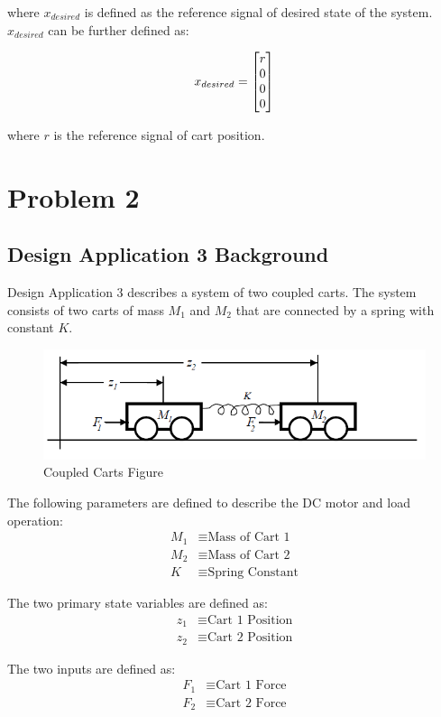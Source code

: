 \documentclass[]{article}
\begin{document}
			where $x_{desired}$ is defined as the reference signal of desired state of the system. $x_{desired}$ can be further defined as:
			
			\begin{equation}
				x_{desired} = \mqty[r\\0\\0\\0]
			\end{equation} 
			
			where $r$ is the reference signal of cart position.
						
\newpage
\section{Problem 2}
	\subsection{Design Application 3 Background}
		Design Application 3 describes a system of two coupled carts. The system consists of two carts of mass $M_1$ and $M_2$ that are connected by a spring with constant $K$.
		
		\begin{figure}[h]
			\centering
			\includegraphics[width=0.7\linewidth]{Fig/DesignApplication3}
			\caption{Coupled Carts Figure}
			\label{fig:designapplication3}
		\end{figure}
		
		The following parameters are defined to describe the DC motor and load operation:
		\begin{align*}
			M_1 &\equiv \text{Mass of Cart 1}\\
			M_2 &\equiv \text{Mass of Cart 2}\\
			K &\equiv \text{Spring Constant}
		\end{align*}
		
		The two primary state variables are defined as:
		\begin{align*}
			z_1 &\equiv \text{Cart 1 Position}\\
			z_2 &\equiv \text{Cart 2 Position}
		\end{align*}
		
		The two inputs are defined as:
		\begin{align*}
			F_1 &\equiv \text{Cart 1 Force}\\
			F_2 &\equiv \text{Cart 2 Force}
		\end{align*}
		
\end{document}
